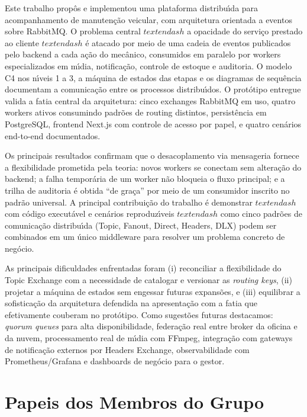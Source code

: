 \documentclass[10pt,a4paper]{article}
\begin{document}
Este trabalho prop\^os e implementou uma plataforma distribu\'\i da para acompanhamento de manuten\c{c}\~ao veicular, com arquitetura orientada a eventos sobre RabbitMQ. O problema central \(textendash\) a opacidade do servi\c{c}o prestado ao cliente \(textendash\) \'e atacado por meio de uma cadeia de eventos publicados pelo backend a cada a\c{c}\~ao do mec\^anico, consumidos em paralelo por workers especializados em m\'\i dia, notifica\c{c}\~ao, controle de estoque e auditoria. O modelo C4 nos n\'\i veis 1 a 3, a m\'aquina de estados das etapas e os diagramas de sequ\^encia documentam a comunica\c{c}\~ao entre os processos distribu\'\i dos. O prot\'otipo entregue valida a fatia central da arquitetura: cinco exchanges RabbitMQ em uso, quatro workers ativos consumindo padr\~oes de routing distintos, persist\^encia em PostgreSQL, frontend Next.js com controle de acesso por papel, e quatro cen\'arios end-to-end documentados.

Os principais resultados confirmam que o desacoplamento via mensageria fornece a flexibilidade prometida pela teoria: novos workers se conectam sem altera\c{c}\~ao do backend; a falha tempor\'aria de um worker n\~ao bloqueia o fluxo principal; e a trilha de auditoria \'e obtida ``de gra\c{c}a'' por meio de um consumidor inscrito no padr\~ao universal. A principal contribui\c{c}\~ao do trabalho \'e demonstrar \(textendash\) com c\'odigo execut\'avel e cen\'arios reproduz\'\i veis \(textendash\) como cinco padr\~oes de comunica\c{c}\~ao distribu\'\i da (Topic, Fanout, Direct, Headers, DLX) podem ser combinados em um \'unico middleware para resolver um problema concreto de neg\'ocio.

As principais dificuldades enfrentadas foram (i) reconciliar a flexibilidade do Topic Exchange com a necessidade de catalogar e versionar as \emph{routing keys}, (ii) projetar a m\'aquina de estados sem engessar futuras expans\~oes, e (iii) equilibrar a sofistica\c{c}\~ao da arquitetura defendida na apresenta\c{c}\~ao com a fatia que efetivamente couberam no prot\'otipo. Como sugest\~oes futuras destacamos: \emph{quorum queues} para alta disponibilidade, federa\c{c}\~ao real entre broker da oficina e da nuvem, processamento real de m\'\i dia com FFmpeg, integra\c{c}\~ao com gateways de notifica\c{c}\~ao externos por Headers Exchange, observabilidade com Prometheus/Grafana e dashboards de neg\'ocio para o gestor.

\section*{Papeis dos Membros do Grupo}
\end{document}
